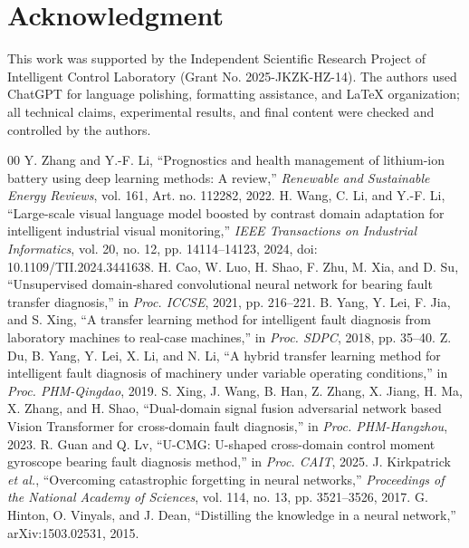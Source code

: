 \documentclass[conference,letterpaper]{IEEEtran}\IEEEoverridecommandlockouts
\begin{document}
\FloatBarrier
\section*{Acknowledgment}
This work was supported by the Independent Scientific Research Project of Intelligent Control Laboratory (Grant No. 2025-JKZK-HZ-14). The authors used ChatGPT for language polishing, formatting assistance, and LaTeX organization; all technical claims, experimental results, and final content were checked and controlled by the authors.

\begin{thebibliography}{00}
 Y. Zhang and Y.-F. Li, ``Prognostics and health management of lithium-ion battery using deep learning methods: A review,'' \emph{Renewable and Sustainable Energy Reviews}, vol. 161, Art. no. 112282, 2022.
 H. Wang, C. Li, and Y.-F. Li, ``Large-scale visual language model boosted by contrast domain adaptation for intelligent industrial visual monitoring,'' \emph{IEEE Transactions on Industrial Informatics}, vol. 20, no. 12, pp. 14114--14123, 2024, doi: 10.1109/TII.2024.3441638.
 H. Cao, W. Luo, H. Shao, F. Zhu, M. Xia, and D. Su, ``Unsupervised domain-shared convolutional neural network for bearing fault transfer diagnosis,'' in \emph{Proc. ICCSE}, 2021, pp. 216--221.
 B. Yang, Y. Lei, F. Jia, and S. Xing, ``A transfer learning method for intelligent fault diagnosis from laboratory machines to real-case machines,'' in \emph{Proc. SDPC}, 2018, pp. 35--40.
 Z. Du, B. Yang, Y. Lei, X. Li, and N. Li, ``A hybrid transfer learning method for intelligent fault diagnosis of machinery under variable operating conditions,'' in \emph{Proc. PHM-Qingdao}, 2019.
 S. Xing, J. Wang, B. Han, Z. Zhang, X. Jiang, H. Ma, X. Zhang, and H. Shao, ``Dual-domain signal fusion adversarial network based Vision Transformer for cross-domain fault diagnosis,'' in \emph{Proc. PHM-Hangzhou}, 2023.
 R. Guan and Q. Lv, ``U-CMG: U-shaped cross-domain control moment gyroscope bearing fault diagnosis method,'' in \emph{Proc. CAIT}, 2025.
 J. Kirkpatrick \emph{et al.}, ``Overcoming catastrophic forgetting in neural networks,'' \emph{Proceedings of the National Academy of Sciences}, vol. 114, no. 13, pp. 3521--3526, 2017.
 G. Hinton, O. Vinyals, and J. Dean, ``Distilling the knowledge in a neural network,'' arXiv:1503.02531, 2015.

\end{thebibliography}
\end{document}
